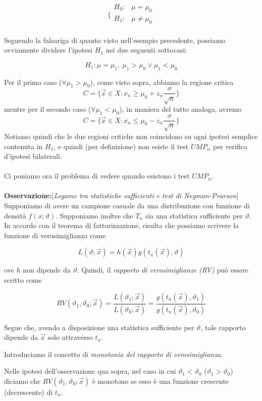 $$\bigg \{
\begin{array}{rl}
H_0: & \mu = \mu_0 \\
H_1: & \mu \neq \mu_0 \\
\end{array}
$$

Seguendo la falsariga di quanto visto nell'esempio precedente, possiamo ovviamente dividere l'ipotesi $H_1$ nei due seguenti sottocasi:

$$H_1: \mu = \mu_1,\ \mu_1 > \mu_0 \vee \mu_1 < \mu_0 $$

Per il primo caso ($ \forall \mu_1 > \mu_0$), come visto sopra, abbiamo la regione critica
$$C=\{ \vec{x} \in X : \overline{x_n} \geq \mu_0 + z_\alpha \frac{\sigma}{\sqrt{n}} \}$$ 
mentre per il secondo caso ($\forall \mu_1 < \mu_0$), in maniera del tutto analoga, avremo
$$C=\{ \vec{x} \in X : \overline{x_n} \leq \mu_0 - z_\alpha \frac{\sigma}{\sqrt{n}} \}$$  
Notiamo quindi che le due regioni critiche non coincidono su ogni ipotesi semplice contenuta in $H_1$, e quindi (per definizione) non esiste il test $UMP_\alpha$ per verifica d'ipotesi bilaterali.\\
\\
Ci poniamo ora il problema di vedere quando esistono i test $UMP_\alpha$.\\
\\
\noindent \textbf{Osservazione:}[\textit{Legame tra statistiche sufficienti e test di Neyman-Pearson}]
Supponiamo di avere un campione casuale da una distribuzione con funzione di densità $f(x;\vartheta)$.
Supponiamo inoltre che $T_n$ sia una statistica sufficiente per $\vartheta$.
In accordo con il teorema di fattorizzazione, risulta che possiamo scrivere la funzione di verosimiglianza come

$$L(\vartheta;\vec{x}) = h(\vec{x}) g(t_n(\vec{x}),\vartheta)$$

ove $h$ non dipende da $\vartheta$.
Quindi, il \textit{rapporto di verosimiglianze (RV)} può essere scritto come

$$RV(\vartheta_1,\vartheta_0; \vec{x}) = \frac{L(\vartheta_1;\vec{x})}{L(\vartheta_0;\vec{x})} = \frac{g(t_n(\vec{x}), \vartheta_1)}{g(t_n(\vec{x}), \vartheta_0)}$$

Segue che, avendo a disposizione una statistica sufficiente per $\vartheta$, tale rapporto dipende da $\vec{x}$ solo attraverso $t_n$.

Introduciamo il concetto di \textit{monotonia del rapporto di verosimiglianza}.

\begin{definizione}
Nelle ipotesi dell'osservazione qua sopra, nel caso in cui $\vartheta_1 < \vartheta_0$ ($\vartheta_1 > \vartheta_0$) diciamo che $RV(\vartheta_1,\vartheta_0; \vec{x})$ è monotono se esso è una funzione crescente (decrescente) di $t_n$. 
\end{definizione}

